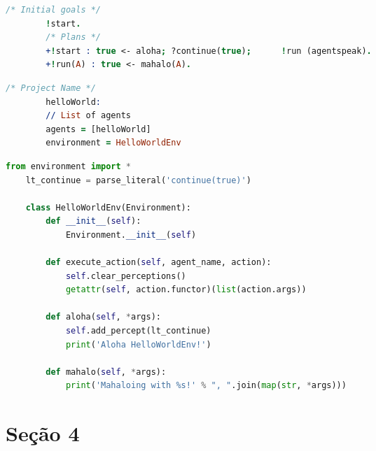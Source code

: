 \documentclass[a0,portrait]{a0poster}
\begin{document}
\begin{multicols}{2}
\begin{minipage}{.235\textwidth}
\begin{minipage}{\textwidth}
\begin{lstlisting}[language=Prolog, label={alg:exemplo-hello-world}, caption={Exemplo de programa em AgentSpeak(L).}]
		/* Initial goals */			
		!start.
		/* Plans */
		+!start : true <- aloha; ?continue(true);      !run (agentspeak).
		+!run(A) : true <- mahalo(A).
		\end{lstlisting}
	\end{minipage}\hfill
	\vspace{7mm}
	
	\begin{minipage}{\textwidth}
		\lstset{style=codeStyle}
		\begin{lstlisting}[language=Prolog, label={alg:exemplo-projeto-hello-world}, caption={Exemplo de projeto do AgentSpeak(Py).}]
		/* Project Name */
		helloWorld:
		// List of agents
		agents = [helloWorld]
		environment = HelloWorldEnv
		\end{lstlisting}
	\end{minipage}\hfill
\end{minipage}\hfill
\begin{minipage}{.235\textwidth}
	\lstset{style=codeStyle}
	\begin{lstlisting}[language=Python, label={alg:exemplo-environment}, caption={Exemplo da descrição do ambiente em Python.}]
	from environment import *
	lt_continue = parse_literal('continue(true)')
	
	class HelloWorldEnv(Environment):
		def __init__(self):
			Environment.__init__(self)
		
		def execute_action(self, agent_name, action):
			self.clear_perceptions()
			getattr(self, action.functor)(list(action.args))
		
		def aloha(self, *args):
			self.add_percept(lt_continue)
			print('Aloha HelloWorldEnv!')
		
		def mahalo(self, *args):
			print('Mahaloing with %s!' % ", ".join(map(str, *args)))
	\end{lstlisting}
\end{minipage}

\color{NavyBlue}
\section*{\huge Seção 4}
\color{Black}





%
%

\end{multicols}

\end{document}

